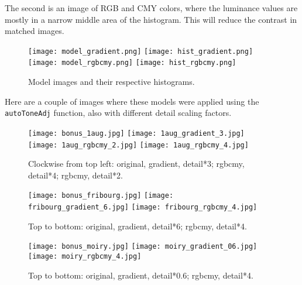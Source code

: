 \documentclass[11pt,a4paper]{article}
\begin{document}
The second is an image of RGB and CMY colors, where the luminance values are mostly in a narrow middle area of the histogram. This will reduce the contrast in matched images.
\begin{figure}[h]
    \begin{center}
    	\texttt{[image: model\_gradient.png]}
    	\texttt{[image: hist\_gradient.png]}\\
    	\texttt{[image: model\_rgbcmy.png]}\hspace{70px}
    	\texttt{[image: hist\_rgbcmy.png]}
        \caption{Model images and their respective histograms.}
    \end{center}
\end{figure}

Here are a couple of images where these models were applied using the \texttt{autoToneAdj} function, also with different detail scaling factors.

\begin{figure}[h]
    \begin{center}
    	\texttt{[image: bonus\_1aug.jpg]}
    	\texttt{[image: 1aug\_gradient\_3.jpg]}
    	\texttt{[image: 1aug\_rgbcmy\_2.jpg]}
    	\texttt{[image: 1aug\_rgbcmy\_4.jpg]}
        \caption{Clockwise from top left: original, gradient, detail*3; rgbcmy, detail*4; rgbcmy, detail*2.}
    \end{center}
\end{figure}

\begin{figure}[h]
    \begin{center}
    	\texttt{[image: bonus\_fribourg.jpg]}
    	\texttt{[image: fribourg\_gradient\_6.jpg]}
    	\texttt{[image: fribourg\_rgbcmy\_4.jpg]}
        \caption{Top to bottom: original, gradient, detail*6; rgbcmy, detail*4.}
    \end{center}
\end{figure}

\begin{figure}[h]
    \begin{center}
    	\texttt{[image: bonus\_moiry.jpg]}
    	\texttt{[image: moiry\_gradient\_06.jpg]}
    	\texttt{[image: moiry\_rgbcmy\_4.jpg]}
        \caption{Top to bottom: original, gradient, detail*0.6; rgbcmy, detail*4.}
    \end{center}
\end{figure}
\end{document}
